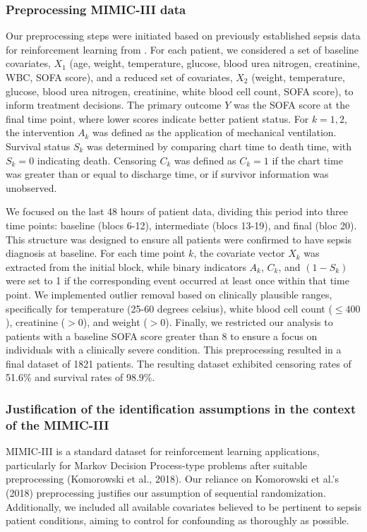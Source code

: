 \documentclass{article}
\newcommand{\tred}{{}}   %
\begin{document}
\subsubsection{Preprocessing MIMIC-III data}
Our preprocessing steps were initiated based on previously established sepsis data for reinforcement learning from \cite{komorowski2018artificial}.
For each patient, we considered a set of baseline covariates, $X_1$ (age, weight, temperature, glucose, blood urea nitrogen, creatinine, WBC, SOFA score), and a reduced set of covariates, $X_2$ (weight, temperature, glucose, blood urea nitrogen, creatinine, white blood cell count, SOFA score), to inform treatment decisions. The primary outcome $Y$ was the SOFA score at the final time point, where lower scores indicate better patient status. 
For $k=1,2$, the intervention $A_k$ was defined as the application of mechanical ventilation.  Survival status $S_k$ was determined by comparing chart time to death time, with $S_k=0$ indicating death. Censoring $C_k$ was defined as $C_k=1$ if the chart time was greater than or equal to discharge time, or if survivor information was unobserved.  

We focused on the last 48 hours of patient data, dividing this period into three time points: baseline (blocs 6-12), intermediate (blocs 13-19), and final (bloc 20). This structure was designed to ensure all patients were confirmed to have sepsis diagnosis at baseline. 
For each time point $k$, the covariate vector $X_k$ was extracted from the initial block, while binary indicators $A_k$, $C_k$, and $(1-S_k)$ were set to 1 if the corresponding event occurred at least once within that time point. We implemented outlier removal based on clinically plausible ranges, specifically for temperature (25-60 degrees celsius), white blood cell count ($\le 400$), creatinine ($> 0$), and weight ($> 0$).
Finally, we restricted our analysis to patients with a baseline SOFA score greater than 8 to ensure a focus on individuals with a clinically severe condition. This preprocessing resulted in a final dataset of 1821 patients. The resulting dataset exhibited censoring rates of 51.6\% and survival rates of 98.9\%.


%
\tred{
\subsubsection{Justification of the identification assumptions in the context of the MIMIC-III}
}
MIMIC-III is a standard dataset for reinforcement learning applications, particularly for Markov Decision Process-type problems after suitable preprocessing (Komorowski et al., 2018). Our reliance on Komorowski et al.'s (2018) preprocessing justifies our assumption of sequential randomization. Additionally, we included all available covariates believed to be pertinent to sepsis patient conditions, aiming to control for confounding as thoroughly as possible.
\end{document}
